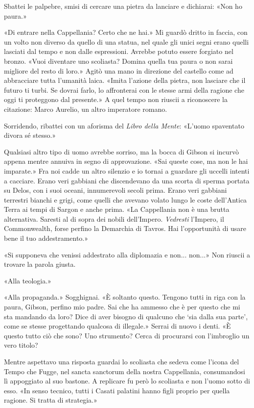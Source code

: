 Sbattei le palpebre, smisi di cercare una pietra da lanciare e
dichiarai: «Non ho paura.»

«Di entrare nella Cappellania? Certo che ne hai.» Mi guardò dritto in
faccia, con un volto non diverso da quello di una statua, nel quale gli
unici segni erano quelli lasciati dal tempo e non dalle espressioni.
Avrebbe potuto essere forgiato nel bronzo. «Vuoi diventare uno
scoliasta? Domina quella tua paura o non sarai migliore del resto di
loro.» Agitò una mano in direzione del castello come ad abbracciare
tutta l'umanità laica. «Imita l'azione della pietra, non lasciare che il
futuro ti turbi. Se dovrai farlo, lo affronterai con le stesse armi
della ragione che oggi ti proteggono dal presente.» A quel tempo non
riuscii a riconoscere la citazione: Marco Aurelio, un altro imperatore
romano.

Sorridendo, ribattei con un aforisma del \emph{Libro della Mente}:
«L'uomo spaventato divora sé stesso.»

Qualsiasi altro tipo di uomo avrebbe sorriso, ma la bocca di Gibson si
incurvò appena mentre annuiva in segno di approvazione. «Sai queste
cose, ma non le hai imparate.» Fra noi cadde un altro silenzio e io
tornai a guardare gli uccelli intenti a cacciare. Erano veri gabbiani
che discendevano da una scorta di sperma portata su Delos, con i suoi
oceani, innumerevoli secoli prima. {Erano} veri gabbiani terrestri
bianchi e grigi, come quelli che avevano volato lungo le coste
dell'Antica Terra ai tempi di Sargon e anche prima. «La Cappellania non
è una brutta alternativa. Saresti al di sopra dei nobili dell'Impero.
\emph{Vedresti} l'Impero, il Commonwealth, forse perfino la Demarchia di
Tavros. Hai l'opportunità di usare bene il tuo addestramento.»

«Si supponeva che venissi addestrato alla diplomazia e non... non...»
Non riuscii a trovare la parola giusta.

«Alla teologia.»

«Alla propaganda.» Sogghignai. «È soltanto questo. Tengono tutti in riga
con la paura, Gibson, perfino mio padre. Sai che ha ammesso che è per
questo che mi sta mandando da loro? Dice di aver bisogno di qualcuno che
`sia dalla sua parte', come se stesse progettando qualcosa di illegale.»
Serrai di nuovo i denti. «È questo tutto ciò che sono? Uno strumento?
Cerca di procurarsi con l'imbroglio un vero titolo?

Mentre aspettavo una risposta guardai lo scoliasta che sedeva come
l'icona del Tempo che Fugge, nel sancta sanctorum della nostra
Cappellania, consumandosi lì appoggiato al suo bastone. A replicare fu
però lo scoliasta e non l'uomo sotto di esso. «In senso tecnico, tutti i
Casati palatini hanno figli proprio per quella ragione. Si tratta di
strategia.»

